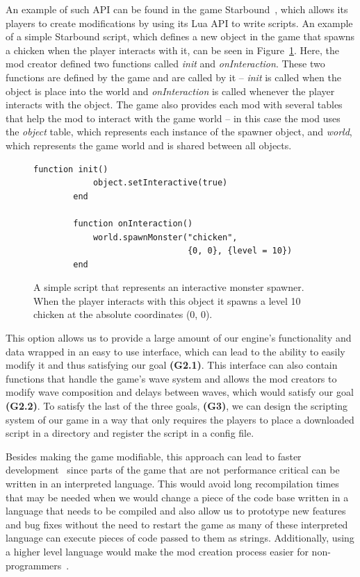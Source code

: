 An example of such API can be found in the game Starbound~\cite{Starbound}, which allows its
players to create modifications by using its Lua API to write scripts. An example of a simple Starbound script,
which defines a new object in the game that spawns a chicken when the player interacts with it,
can be seen in Figure~\ref{sb-lua-mod-ex}. Here, the mod creator defined two functions called \emph{init} and
\emph{onInteraction}. These two functions are defined by the game and are called by it
-- \emph{init} is called when the object is place into the world and \emph{onInteraction} is called
whenever the player interacts with the object. The game also provides each mod with several tables that
help the mod to interact with the game world -- in this case the mod uses the \emph{object} table, which
represents each instance of the spawner object, and \emph{world}, which represents the game world and
is shared between all objects.

\begin{figure}[h]
    \centering
    \begin{lstlisting}[frame=single]
        function init()
            object.setInteractive(true)
        end

        function onInteraction()
            world.spawnMonster("chicken",
                               {0, 0}, {level = 10})
        end
    \end{lstlisting}
    \caption{A simple script that represents an interactive monster spawner. When the player interacts
            with this object it spawns a level 10 chicken at the absolute coordinates (0, 0).}
    \label{sb-lua-mod-ex}
\end{figure}

This option allows us to provide a large amount of our engine's functionality and data wrapped in an easy to use interface, which can lead
to the ability to easily modify it and thus satisfying our goal \textbf{(G2.1)}. This interface can also contain functions that handle the
game's wave system and allows the mod creators to modify wave composition and delays between waves, which would satisfy our goal
\textbf{(G2.2)}. To satisfy the last of the three goals, \textbf{(G3)}, we can design the scripting system of our game in a way that only
requires the players to place a downloaded script in a directory and register the script in a config file.

Besides making the game modifiable, this approach can lead to faster development~\cite{GEA} since parts of the game that are not performance
critical can be written in an interpreted language. This would avoid long recompilation times that
may be needed when we would change a piece of the code base written in a language that needs to be compiled and also allow 
us to prototype new features and bug fixes
without the need to restart the game as many of these interpreted language can execute pieces of code passed to them as strings.
Additionally, using a higher level language would make the mod creation process easier for non-programmers~\cite{WhyScripting}.


